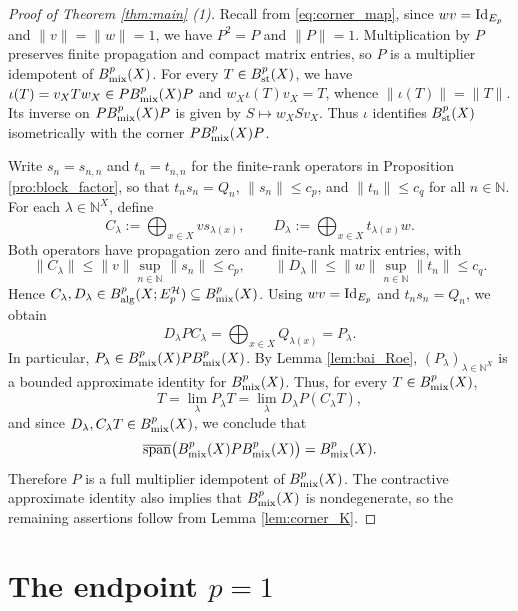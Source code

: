 \documentclass[11pt,reqno]{amsart}
\theoremstyle{definition}
\theoremstyle{plain}
\def\IN{\mathbb N}\def\IR{\mathbb R}\def\IE{\mathbb E}\def\IC{\mathbb C}\def\IL{\mathbb L}\def\IQ{\mathbb Q}\def\IA{\mathbb A}\def\IZ{\mathbb Z}
\begin{document}
\begin{proof}[Proof of Theorem \ref{thm:main} (1)]
Recall from \eqref{eq:corner_map}, since $wv=\textup{Id}_{E_p}$ and $\|v\|=\|w\|=1$, we have $P^2=P$ and $\|P\|=1$. Multiplication by $P$ preserves finite propagation and compact matrix entries, so $P$ is a multiplier idempotent of $B^p_{\textup{mix}}(X)$. For every $T\in B^p_{\textup{st}}(X)$, we have $\iota(T)=v_XTw_X\in PB^p_{\textup{mix}}(X)P$ and $w_X\iota(T)v_X=T$, whence $\|\iota(T)\|=\|T\|$. Its inverse on $PB^p_{\textup{mix}}(X)P$ is given by $S\mapsto w_XSv_X$. Thus $\iota$ identifies $B^p_{\textup{st}}(X)$ isometrically with the corner $PB^p_{\textup{mix}}(X)P$.

Write $s_n=s_{n,n}$ and $t_n=t_{n,n}$ for the finite-rank operators in Proposition \ref{pro:block_factor}, so that $t_ns_n=Q_n$, $\|s_n\|\le c_p$, and $\|t_n\|\le c_q$ for all $n\in\IN$. For each $\lambda\in\IN^X$, define
\[
C_\lambda:=\bigoplus_{x\in X}v s_{\lambda(x)},\qquad D_\lambda:=\bigoplus_{x\in X}t_{\lambda(x)}w.
\]
Both operators have propagation zero and finite-rank matrix entries, with
\[
\|C_\lambda\|\le\|v\|\sup_{n\in\IN}\|s_n\|\le c_p,\qquad \|D_\lambda\|\le\|w\|\sup_{n\in\IN}\|t_n\|\le c_q.
\]
Hence $C_\lambda,D_\lambda\in B^p_{\textup{alg}}(X;E_p^{\mathcal H})\subseteq B^p_{\textup{mix}}(X)$. Using $wv=\textup{Id}_{E_p}$ and $t_ns_n=Q_n$, we obtain
\begin{equation}\label{eq:Pnu_in_BpB}
D_\lambda P C_\lambda=\bigoplus_{x\in X}Q_{\lambda(x)}=P_\lambda.
\end{equation}
In particular, $P_\lambda\in B^p_{\textup{mix}}(X)PB^p_{\textup{mix}}(X)$. By Lemma \ref{lem:bai_Roe}, $(P_\lambda)_{\lambda\in\IN^X}$ is a bounded approximate identity for $B^p_{\textup{mix}}(X)$. Thus, for every $T\in B^p_{\textup{mix}}(X)$,
\[
T=\lim_\lambda P_\lambda T=\lim_\lambda D_\lambda P(C_\lambda T),
\]
and since $D_\lambda,C_\lambda T\in B^p_{\textup{mix}}(X)$, we conclude that
\[
\overline{\operatorname{span}}\big(B^p_{\textup{mix}}(X)PB^p_{\textup{mix}}(X)\big)=B^p_{\textup{mix}}(X).
\]
Therefore $P$ is a full multiplier idempotent of $B^p_{\textup{mix}}(X)$. The contractive approximate identity also implies that $B^p_{\textup{mix}}(X)$ is nondegenerate, so the remaining assertions follow from Lemma \ref{lem:corner_K}.
\end{proof}


\section{The endpoint \texorpdfstring{$p=1$}{p=1}}\label{sec:endpoint}
\end{document}
